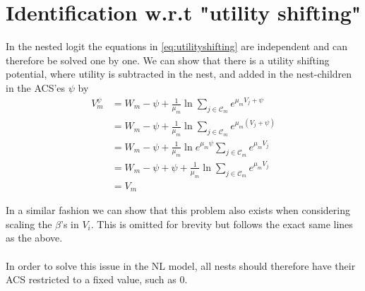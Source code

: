 
\FloatBarrier
\section{Identification w.r.t "utility shifting"}
\label{app:utilityshifting}
In the nested logit the equations in \eqref{eq:utilityshifting} are independent and can therefore be solved one by one. We can show that there is a utility shifting potential, where utility is subtracted in the nest, and added in the nest-children in the ACS'es $\psi$ by
\begin{equation}
  \begin{split}
    V_m^{\psi} &= W_m - \psi + \frac{1}{\mu_m} \ln \sum_{j\in \mathcal{C}_m} e^{\mu_m V_j + \psi} \\
    & = W_m - \psi + \frac{1}{\mu_m} \ln \sum_{j\in \mathcal{C}_m} e^{\mu_m (V_j + \psi)} \\
    &=  W_m - \psi + \frac{1}{\mu_m} \ln e^{\mu_m \psi} \sum_{j\in \mathcal{C}_m} e^{\mu_m V_j} \\
    &= W_m - \psi + \psi + \frac{1}{\mu_m} \ln \sum_{j\in \mathcal{C}_m} e^{\mu_m V_j} \\
    &= V_m
  \end{split}
\end{equation}

In a similar fashion we can show that this problem also exists when considering scaling the $\beta$'s in $V_i$. This is omitted for brevity but follows the exact same lines as the above.
\\ \\
In order to solve this issue in the NL model, all nests should therefore have their ACS restricted to a fixed value, such as $0$.
